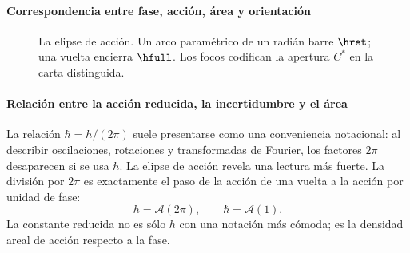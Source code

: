 \paragraph{Correspondencia entre fase, acción, área y orientación}

\begin{figure}[H]
\centering
{}
\caption{La elipse de acción. Un arco paramétrico de un radián barre
\(\hret\); una vuelta encierra \(\hfull\). Los focos codifican la apertura
\(C^*\) en la carta distinguida.}
\label{fig:elipse-accion}
\end{figure}

\paragraph{Relación entre la acción reducida, la incertidumbre y el área}

La relación \(\hbar=h/(2\pi)\) suele presentarse como una conveniencia
notacional: al describir oscilaciones, rotaciones y transformadas de Fourier,
los factores \(2\pi\) desaparecen si se usa \(\hbar\). La elipse de acción
revela una lectura más fuerte. La división por \(2\pi\) es exactamente el
paso de la acción de una vuelta a la acción por unidad de fase:
\[
h=\mathcal A(2\pi),\qquad \hbar=\mathcal A(1).
\]
La constante reducida no es sólo \(h\) con una notación más cómoda; es la
densidad areal de acción respecto a la fase.

